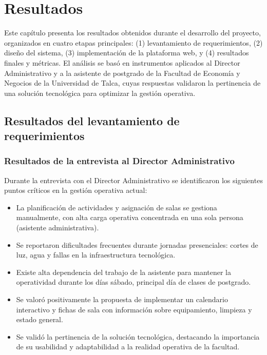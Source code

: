 \chapter{Resultados}
\label{ch:results}

Este capítulo presenta los resultados obtenidos durante el desarrollo del proyecto, organizados en cuatro etapas principales: (1) levantamiento de requerimientos, (2) diseño del sistema, (3) implementación de la plataforma web, y (4) resultados finales y métricas. El análisis se basó en instrumentos aplicados al Director Administrativo y a la asistente de postgrado de la Facultad de Economía y Negocios de la Universidad de Talca, cuyas respuestas validaron la pertinencia de una solución tecnológica para optimizar la gestión operativa.

\section{Resultados del levantamiento de requerimientos}

\subsection{Resultados de la entrevista al Director Administrativo}

Durante la entrevista con el Director Administrativo se identificaron los siguientes puntos críticos en la gestión operativa actual:

\begin{itemize}
    \item La planificación de actividades y asignación de salas se gestiona manualmente, con alta carga operativa concentrada en una sola persona (asistente administrativa).
    \item Se reportaron dificultades frecuentes durante jornadas presenciales: cortes de luz, agua y fallas en la infraestructura tecnológica.
    \item Existe alta dependencia del trabajo de la asistente para mantener la operatividad durante los días sábado, principal día de clases de postgrado.
    \item Se valoró positivamente la propuesta de implementar un calendario interactivo y fichas de sala con información sobre equipamiento, limpieza y estado general.
    \item Se validó la pertinencia de la solución tecnológica, destacando la importancia de su usabilidad y adaptabilidad a la realidad operativa de la facultad.
\end{itemize}


